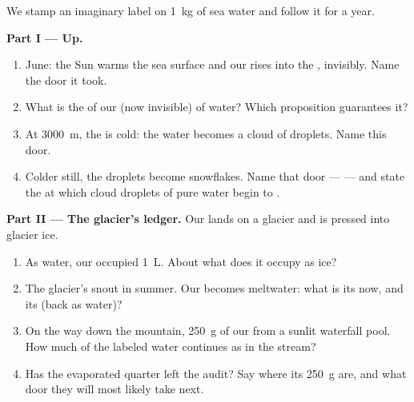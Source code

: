 \begin{problem}\label{pb:g6:water-states:1}
We stamp an imaginary label on \qty{1}{kg} of sea water and follow
it for a year.

\medskip\noindent\textbf{Part I --- Up.}
\begin{enumerate}
  \item June: the Sun warms the sea surface and our  rises
        into the , invisibly. Name the door it took.
  \item What is the  of our (now invisible)  of
        water? Which
        proposition guarantees it?
  \item At \qty{3000}{m}, the  is cold: the water becomes a
        cloud of droplets. Name this door.
  \item Colder still, the droplets become snowflakes. Name that
        door ---  --- and state the  at
        which cloud droplets of pure water begin to .
\end{enumerate}

\medskip\noindent\textbf{Part II --- The glacier's ledger.}
Our  lands on a glacier and is pressed into glacier ice.
\begin{enumerate}[resume]
  \item As water, our  occupied \qty{1}{L}. About what
         does it occupy as ice?
  \item The glacier's snout  in summer. Our  becomes
        meltwater: what is its  now, and its  (back as
         water)?
  \item On the way down the mountain, \qty{250}{g} of our
          from a sunlit waterfall pool. How much
        of the labeled water continues as  in the stream?
  \item Has the evaporated quarter left the audit? Say where its
        \qty{250}{g} are, and what door they will most likely take
        next.
\end{enumerate}


\end{problem}
